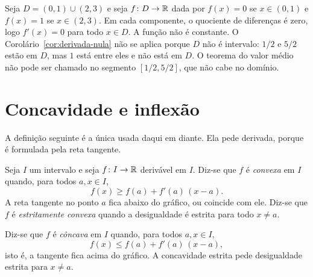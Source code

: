 \documentclass[11pt,a4paper]{article}
\begin{document}
\begin{contraexemplo}
Seja $D=(0,1)\cup(2,3)$ e seja $f\colon D\to\mathbb{R}$ dada por $f(x)=0$ se $x\in(0,1)$ e $f(x)=1$ se $x\in(2,3)$. Em cada componente, o quociente de diferenças é zero, logo $f'(x)=0$ para todo $x\in D$. A função não é constante. O Corolário~\ref{cor:derivada-nula} não se aplica porque $D$ não é intervalo: $1/2$ e $5/2$ estão em $D$, mas $1$ está entre eles e não está em $D$. O teorema do valor médio não pode ser chamado no segmento $[1/2,5/2]$, que não cabe no domínio.
\end{contraexemplo}


\section{Concavidade e inflexão}

A definição seguinte é a única usada daqui em diante. Ela pede derivada, porque é formulada pela reta tangente.

\begin{definicao}
Seja $I$ um intervalo e seja $f\colon I\to\mathbb{R}$ derivável em $I$. Diz-se que $f$ é \emph{convexa} em $I$ quando, para todos $a,x\in I$,
\begin{equation}
\label{eq:convexa}
f(x)\ge f(a)+f'(a)\,(x-a).
\end{equation}
A reta tangente no ponto $a$ fica abaixo do gráfico, ou coincide com ele. Diz-se que $f$ é \emph{estritamente convexa} quando a desigualdade é estrita para todo $x\neq a$.

Diz-se que $f$ é \emph{côncava} em $I$ quando, para todos $a,x\in I$,
\[
f(x)\le f(a)+f'(a)\,(x-a),
\]
isto é, a tangente fica acima do gráfico. A concavidade estrita pede desigualdade estrita para $x\neq a$.
\end{definicao}
\end{document}
